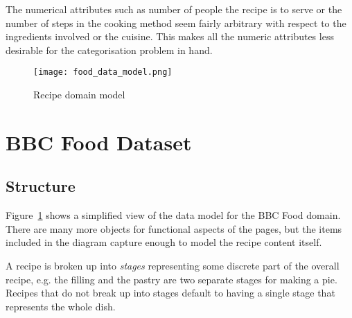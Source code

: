 \documentclass[11pt,a4paper]{article}
\begin{document}
The numerical attributes such as number of people the recipe is to serve or the
number of steps in the cooking method seem fairly arbitrary with respect to the
ingredients involved or the cuisine. This makes all the numeric attributes less
desirable for the categorisation problem in hand.

\begin{comment}
  @startuml food_data_model.png
  
  skinparam monochrome true
  skinparam circledCharacterRadius 0
  skinparam circledCharacterFontSize 0
  skinparam classFontSize 20
  
  class Recipe
  class Stage
  class Cuisine
  class Ingredient {
    quantity
  }
  class Food
  class Diet
  class Method
  class Chef {
    firstName
    surname
  }
  class Programme
  class Occasion
  
  Recipe "0..*" -u- "1" Cuisine
  Recipe "1" -d- "1..*" Stage
  Stage "1" -- "1..*" Ingredient
  Ingredient "1..*" -r- "1" Food
  Diet "0..*" -- "0..*" Recipe
  Recipe "1" -l- "1..*" Method
  Recipe "1..*" -- "1" Chef
  Recipe "1..*" -r- "0..*" Programme
  Recipe "0..*" -d- "0..*" Occasion
  Food "0..*" -u- "0..*" Occasion
  
  @enduml
\end{comment}
\begin{figure}[p]
  \begin{center}
    \texttt{[image: food\_data\_model.png]}
  \end{center}
  \caption{Recipe domain model\label{model}}
\end{figure}

\section{BBC Food Dataset}

\subsection{Structure}

Figure~\ref{model} shows a simplified view of the data model for the BBC Food
domain. There are many more objects for functional aspects of the pages, but
the items included in the diagram capture enough to model the recipe content itself.

A recipe is broken up into \emph{stages} representing some discrete part of the
overall recipe, e.g. the filling and the pastry are two separate stages for
making a pie. Recipes that do not break up into stages default to having a single
stage that represents the whole dish.
\end{document}

